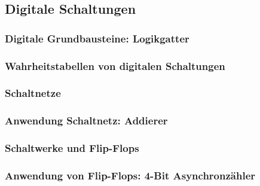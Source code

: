 \subsection{Digitale Schaltungen}

\subsubsection{Digitale Grundbausteine: Logikgatter}

\subsubsection{Wahrheitstabellen von digitalen Schaltungen}

\subsubsection{Schaltnetze}

\subsubsection{Anwendung Schaltnetz: Addierer}

\subsubsection{Schaltwerke und Flip-Flops}

\subsubsection{Anwendung von Flip-Flops: 4-Bit Asynchronzähler}